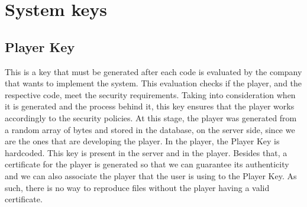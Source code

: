 \documentclass[11pt,a4paper]{report}
\begin{document}
\chapter{System keys}
\section{Player Key}
This is a key that must be generated after each code is evaluated by the company that wants to implement the system. 
This evaluation checks if the player, and the respective code, meet the security requirements. 
Taking into consideration when it is generated and the process behind it, this key ensures that the player works accordingly to the security policies.
\newline At this stage, the player was generated from a random array of bytes and stored in the database, on the server side, since we are the ones that are developing the player.
In the player, the Player Key is hardcoded.
\newline This key is present in the server and in the player.
Besides that, a certificate for the player is generated so that we can guarantee its authenticity and we can also associate the player that the user is using to the Player Key. As such, there is no way to reproduce files without the player having a valid certificate.
\end{document}
